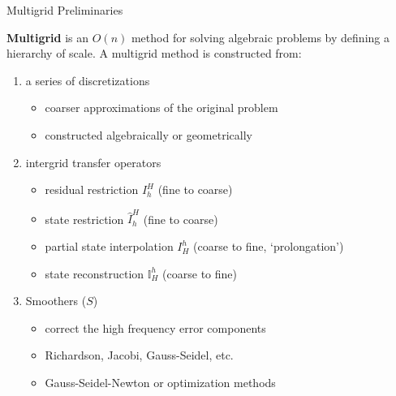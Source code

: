 \documentclass{beamer}
\begin{document}
\begin{frame}[fragile]{Multigrid Preliminaries}
\begin{figure}
    \label{fig:levels}
  \end{figure}
  \textbf{Multigrid} is an $O(n)$ method for solving algebraic problems by defining a hierarchy of scale.
  A multigrid method is constructed from:
  \begin{enumerate}
  \item a series of discretizations
    \begin{itemize}
    \item coarser approximations of the original problem
    \item constructed algebraically or geometrically
    \end{itemize}
  \item intergrid transfer operators
    \begin{itemize}
    \item residual restriction $I_h^H$ (fine to coarse)
    \item state restriction $\hat I_h^H$ (fine to coarse)
    \item partial state interpolation $I_H^h$ (coarse to fine, `prolongation')
    \item state reconstruction $\mathbb{I}_H^h$ (coarse to fine)
    \end{itemize}
  \item Smoothers ($S$)
    \begin{itemize}
    \item correct the high frequency error components
    \item Richardson, Jacobi, Gauss-Seidel, etc.
    \item Gauss-Seidel-Newton or optimization methods
    \end{itemize}
  \end{enumerate}
\end{frame}
\end{document}
